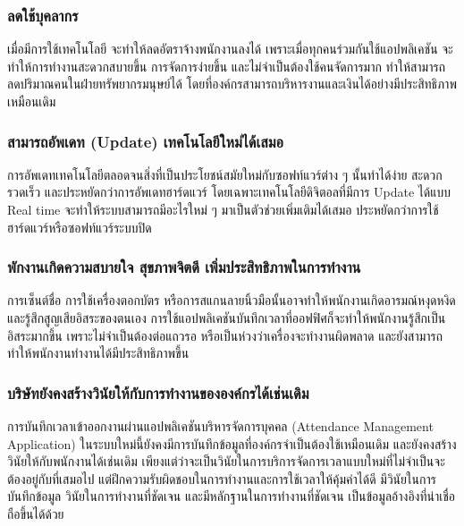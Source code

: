 \subsubsection{ลดใช้บุคลากร}  
\quad เมื่อมีการใช้เทคโนโลยี จะทำให้ลดอัตราจ้างพนักงานลงได้ เพราะเมื่อทุกคนร่วมกันใช้แอปพลิเคชัน 
จะทำให้การทำงานสะดวกสบายขึ้น การจัดการง่ายขึ้น และไม่จำเป็นต้องใช้คนจัดการมาก ทำให้สามารถลดปริมาณคนในฝ่ายทรัพยากรมนุษย์ได้ 
โดยที่องค์กรสามารถบริหารงานและเงินได้อย่างมีประสิทธิภาพเหมือนเดิม 
\subsubsection{สามารถอัพเดท (Update) เทคโนโลยีใหม่ได้เสมอ}
\quad การอัพเดทเทคโนโลยีตลอดจนสิ่งที่เป็นประโยชน์สมัยใหม่กับซอฟท์แวร์ต่าง ๆ นั้นทำได้ง่าย สะดวก รวดเร็ว และประหยัดกว่าการอัพเดทฮาร์ดแวร์ 
โดยเฉพาะเทคโนโลยีดิจิตอลที่มีการ Update ได้แบบ Real time จะทำให้ระบบสามารถมีอะไรใหม่ ๆ มาเป็นตัวช่วยเพิ่มเติมได้เสมอ 
ประหยัดกว่าการใช้ฮาร์ดแวร์หรือซอฟท์แวร์ระบบปิด 
\subsubsection{พักงานเกิดความสบายใจ สุขภาพจิตดี เพิ่มประสิทธิภาพในการทำงาน}
\quad การเซ็นต์ชื่อ การใช้เครื่องตอกบัตร หรือการสแกนลายนิ้วมือนั้นอาจทำให้พนักงานเกิดอารมณ์หงุดหงิด และรู้สึกสูญเสียอิสระของตนเอง 
การใช้แอปพลิเคชันบันทึกเวลาที่ออฟฟิศก็จะทำให้พนักงานรู้สึกเป็นอิสระมากขึ้น เพราะไม่จำเป็นต้องต่อแถวรอ หรือเป็นห่วงว่าเครื่องจะทำงานผิดพลาด
และยังสามารถทำให้พนักงานทำงานได้มีประสิทธิภาพขึ้น 
\subsubsection{บริษัทยังคงสร้างวินัยให้กับการทำงานขององค์กรได้เช่นเดิม}  
\quad การบันทึกเวลาเข้าออกงานผ่านแอปพลิเคชันบริหารจัดการบุคคล (Attendance Management Application) 
ในระบบใหม่นี้ยังคงมีการบันทึกข้อมูลที่องค์กรจำเป็นต้องใช้เหมือนเดิม และยังคงสร้างวินัยให้กับพนักงานได้เช่นเดิม 
เพียงแต่ว่าจะเป็นวินัยในการบริการจัดการเวลาแบบใหม่ที่ไม่จำเป็นจะต้องอยู่กับที่เสมอไป แต่ฝึกความรับผิดชอบในการทำงานและการใช้เวลาให้คุ้มค่าได้ดี 
มีวินัยในการบันทึกข้อมูล วินัยในการทำงานที่ชัดเจน และมีหลักฐานในการทำงานที่ชัดเจน เป็นข้อมูลอ้างอิงที่น่าเชื่อถือขึ้นได้ด้วย 

